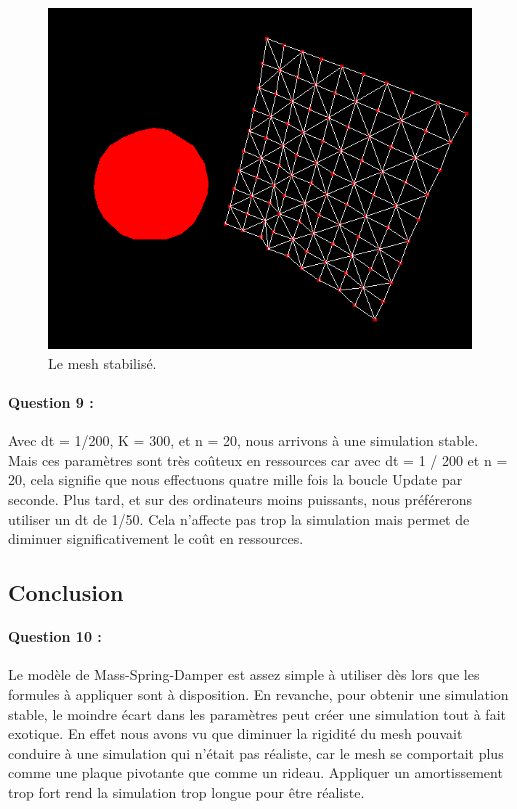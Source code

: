 \documentclass[a4paper,12pt]{article}
\begin{document}
\begin{figure}[ht!]
  \centering
  \includegraphics[width=\textwidth]{images/rideau_fin.png}
  \caption{Le mesh stabilisé.}
  \label{fig:rideauFell}
\end{figure}

\paragraph{Question 9 :} 	Avec dt = 1/200, K = 300, et n = 20, nous arrivons à une simulation stable. Mais ces paramètres sont très coûteux en ressources car avec dt = 1 / 200 et n = 20, cela signifie que nous effectuons quatre mille fois la boucle \og{}Update\fg{} par seconde. Plus tard, et sur des ordinateurs moins puissants, nous préférerons utiliser un dt de 1/50. Cela n'affecte pas trop la simulation mais permet de diminuer significativement le coût en ressources.

\subsection{Conclusion}
\paragraph{Question 10 :} Le modèle de Mass-Spring-Damper est assez simple à utiliser dès lors que les formules à appliquer sont à disposition. En revanche, pour obtenir une simulation stable, le moindre écart dans les paramètres peut créer une simulation tout à fait exotique. En effet nous avons vu que diminuer la rigidité du mesh pouvait conduire à une simulation qui n'était pas réaliste, car le mesh se comportait plus comme une plaque pivotante que comme un rideau. Appliquer un amortissement trop fort rend la simulation trop longue pour être réaliste.
\end{document}
